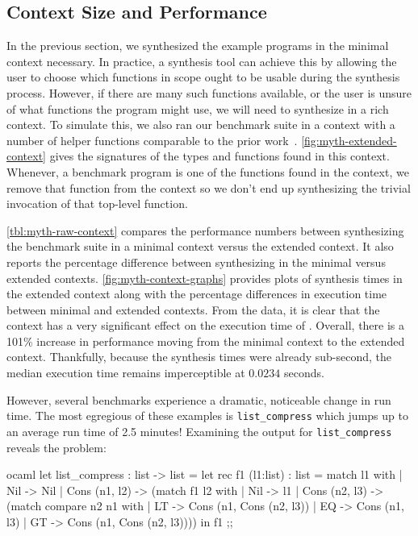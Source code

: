 \subsection{Context Size and Performance}
\label{subsec:context-size-and-performance}



In the previous section, we synthesized the example programs in the minimal context necessary.
In practice, a synthesis tool can achieve this by allowing the user to choose which functions in scope ought to be usable during the synthesis process.
However, if there are many such functions available, or the user is unsure of what functions the program might use, we will need to synthesize in a rich context.
To simulate this, we also ran our benchmark suite in a context with a number of helper functions comparable to the prior work~\citep{albarghouthi-cav-2013, kuncak-pldi-2010}.
\autoref{fig:myth-extended-context} gives the signatures of the types and functions found in this context.
Whenever, a benchmark program is one of the functions found in the context, we remove that function from the context so we don't end up synthesizing the trivial invocation of that top-level function.




\autoref{tbl:myth-raw-context} compares the performance numbers between synthesizing the benchmark suite in a minimal context versus the extended context.
It also reports the percentage difference between synthesizing in the minimal versus extended contexts.
\autoref{fig:myth-context-graphs} provides plots of synthesis times in the extended context along with the percentage differences in execution time between minimal and extended contexts.
From the data, it is clear that the context has a very significant effect on the execution time of \myth{}.
Overall, there is a 101\% increase in performance moving from the minimal context to the extended context.
Thankfully, because the synthesis times were already sub-second, the median execution time remains imperceptible at $0.0234$ seconds.

However, several benchmarks experience a dramatic, noticeable change in run time.
The most egregious of these examples is \texttt{list\_compress} which jumps up to an average run time of 2.5 minutes!
Examining the output for \texttt{list\_compress} reveals the problem:

\begin{center}
  \begin{cminted}{ocaml}
let list_compress : list -> list =
  let rec f1 (l1:list) : list =
    match l1 with
    | Nil -> Nil
    | Cons (n1, l2) ->
      (match f1 l2 with
      | Nil -> l1
      | Cons (n2, l3) ->
        (match compare n2 n1 with
        | LT -> Cons (n1, Cons (n2, l3))
        | EQ -> Cons (n1, l3)
        | GT -> Cons (n1, Cons (n2, l3))))
in
  f1
;;
  \end{cminted}
\end{center}

